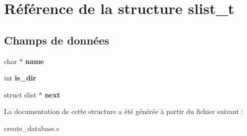\hypertarget{structslist__t}{\section{Référence de la structure slist\-\_\-t}
\label{structslist__t}
}
\subsection*{Champs de données}
\begin{DoxyCompactItemize}
\item 
\hypertarget{structslist__t_a5ac083a645d964373f022d03df4849c8}{char $\ast$ {\bfseries name}}\label{structslist__t_a5ac083a645d964373f022d03df4849c8}

\item 
\hypertarget{structslist__t_ad39f70e6e4e7d93801b4810fb5138060}{int {\bfseries is\-\_\-dir}}\label{structslist__t_ad39f70e6e4e7d93801b4810fb5138060}

\item 
\hypertarget{structslist__t_a7c8ee186f75ca8d5f092b8e9f961dca3}{struct slist $\ast$ {\bfseries next}}\label{structslist__t_a7c8ee186f75ca8d5f092b8e9f961dca3}

\end{DoxyCompactItemize}


La documentation de cette structure a été générée à partir du fichier suivant \-:\begin{DoxyCompactItemize}
\item 
create\-\_\-database.\-c\end{DoxyCompactItemize}
